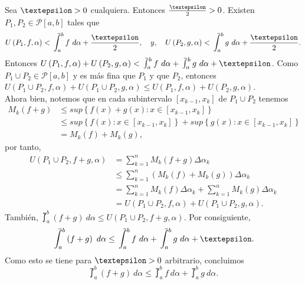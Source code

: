 Sea $\text{\textepsilon}>0$ cualquiera. Entonces $\frac{\text{\textepsilon}}{2}>0$. Existen $P_1,P_2\in\mathcal{P}\left[a,b\right]$ tales que
  \begin{equation*}
    U\left(P_1,f,\alpha\right) < \upint_a^b f\ d\alpha + \frac{\textepsilon}{2},\quad y,\quad U\left(P_2,g,\alpha\right) < \upint_a^b g\ d\alpha + \frac{\textepsilon}{2}.
  \end{equation*}
  Entonces $U\left(P_1,f,\alpha\right)+U\left(P_2,g,\alpha\right)<\upint_a^b f\ d\alpha + \upint_a^b g\ d\alpha + \text{\textepsilon}$. Como $P_1\cup P_2 \in \mathcal{P}\left[a,b\right]$ y es más fina que $P_1$ y que $P_2$, entonces $U\left(P_1\cup P_2,f,\alpha\right)+U\left(P_1\cup P_2,g,\alpha\right) \leq U\left(P_1,f,\alpha\right)+U\left(P_2,g,\alpha\right)$.\\
  Ahora bien, notemos que en cada subintervalo $\left[x_{k-1},x_k\right]$ de $P_1\cup P_2$ tenemos
  \begin{align*}
    M_k\left(f+g\right)&\leq sup\left\lbrace f\left(x\right)+g\left(x\right): x\in\left[x_{k-1},x_k\right]\right\rbrace\\
    &\leq sup\left\lbrace f\left(x\right): x\in\left[x_{k-1},x_k\right]\right\rbrace+sup\left\lbrace g\left(x\right): x\in\left[x_{k-1},x_k\right]\right\rbrace\\
    &=M_k\left(f\right)+M_k\left(g\right),
  \end{align*}
por tanto,
\begin{align*}
  U\left(P_1\cup P_2, f+g, \alpha\right)&= \sum_{k=1}^{n} M_k\left(f+g\right)\Delta\alpha_k\\
  &\leq\sum_{k=1}^{n} \left(M_k\left(f\right)+M_k\left(g\right)\right)\Delta\alpha_k\\
  &=\sum_{k=1}^{n} M_k\left(f\right)\Delta\alpha_k+\sum_{k=1}^{n} M_k\left(g\right)\Delta\alpha_k\\
  &=U\left(P_1\cup P_2, f, \alpha\right)+U\left(P_1\cup P_2, g, \alpha\right).
\end{align*}
También, $\upint_a^b\left(f+g\right)\ d\alpha \leq U\left(P_1\cup P_2, f+g, \alpha\right)$. Por consiguiente,
\begin{equation*}
\upint_a^b \left(f+g\right)\ d\alpha \leq \upint_a^b f\ d\alpha + \upint_a^b g\ d\alpha +  \text{\textepsilon}.
\end{equation*}
Como esto se tiene para $\text{\textepsilon}>0$ arbitrario, concluimos
\begin{equation*}
\upint_a^b \left(f+g\right)\ d\alpha \leq \upint_a^b f\ d\alpha + \upint_a^b g\ d\alpha .
\end{equation*}

